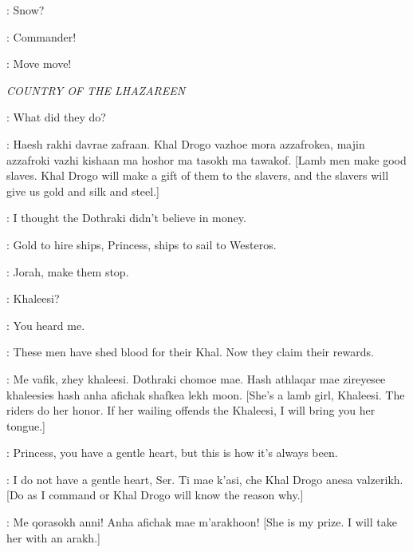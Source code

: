 \JEOR: Snow? 

\JON: Commander! 


\JON: Move move! 


\scene

\textit{COUNTRY OF THE LHAZAREEN}


\DAENERYS: What did they do? 

\RAKHARO: Haesh rakhi davrae zafraan. Khal Drogo vazhoe mora azzafrokea, majin azzafroki vazhi kishaan ma hoshor ma tasokh ma tawakof. [Lamb men make good slaves. Khal Drogo will make a gift of them to the slavers, and the slavers will give us gold and silk and steel.] 

\DAENERYS: I thought the Dothraki didn't believe in money. 

\JORAH: Gold to hire ships, Princess, ships to sail to Westeros. 


\DAENERYS: Jorah, make them stop. 

\JORAH: Khaleesi? 

\DAENERYS: You heard me. 

\JORAH: These men have shed blood for their Khal. Now they claim their rewards. 

\RAKHARO: Me vafik, zhey khaleesi. Dothraki chomoe mae. Hash athlaqar mae zireyesee khaleesies hash anha afichak shafkea lekh moon. [She's a lamb girl, Khaleesi. The riders do her honor. If her wailing offends the Khaleesi, I will bring you her tongue.] 

\JORAH: Princess, you have a gentle heart, but this is how it's always been. 

\DAENERYS: I do not have a gentle heart, Ser. Ti mae k'asi, che Khal Drogo anesa valzerikh. [Do as I command or Khal Drogo will know the reason why.]


\MAGO: Me qorasokh anni! Anha afichak mae m'arakhoon! [She is my prize. I will take her with an arakh.] 

